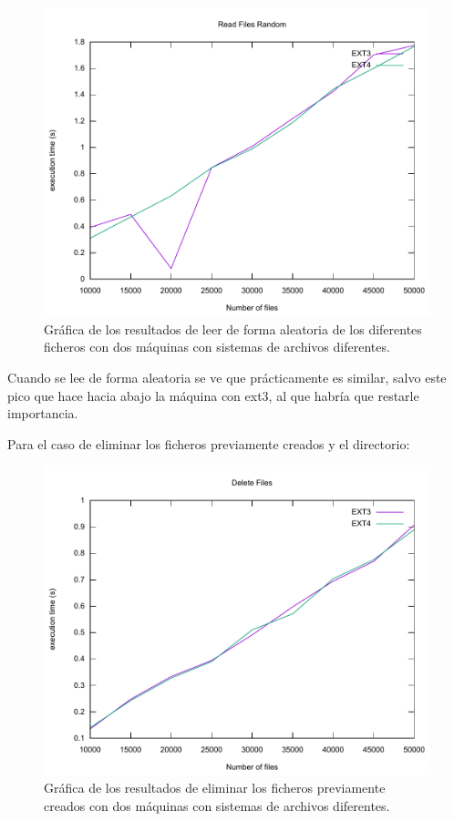 \begin{figure}[H]
	\begin{center}
		\includegraphics[width=15cm]{Imagenes/Read_Files_Random}
		\caption{Gráfica de los resultados de leer de forma aleatoria de los diferentes ficheros con dos máquinas con sistemas de archivos diferentes.}
		\label{fig:32}
	\end{center}
\end{figure}

Cuando se lee de forma aleatoria se ve que prácticamente es similar, salvo este pico que hace hacia abajo la máquina con ext3, al que habría que restarle importancia.

\newpage
Para el caso de eliminar los ficheros previamente creados y el directorio:

\begin{figure}[H]
	\begin{center}
		\includegraphics[width=15cm]{Imagenes/Delete_Files}
		\caption{Gráfica de los resultados de eliminar los ficheros previamente creados con dos máquinas con sistemas de archivos diferentes.}
		\label{fig:33}
	\end{center}
\end{figure}

